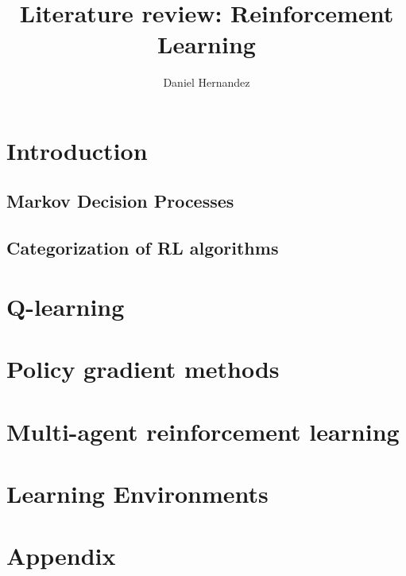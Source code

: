 \documentclass{article}
\title{\textbf{Literature review: Reinforcement Learning}}
\author{Daniel Hernandez}
\date{ }
\begin{document}
\maketitle

\tableofcontents

% 
% 
\section{Introduction}
%

    \subsection{Markov Decision Processes}\label{section:markov-decision-processes}
    

    \subsection{Categorization of RL algorithms}
    
    
    
\section{Q-learning}\label{section:q-learning}

 
\section{Policy gradient methods}\label{section:policy-gradient-methods}

  
\section{Multi-agent reinforcement learning}


\section{Learning Environments}


\section{Appendix}




\end{document}
